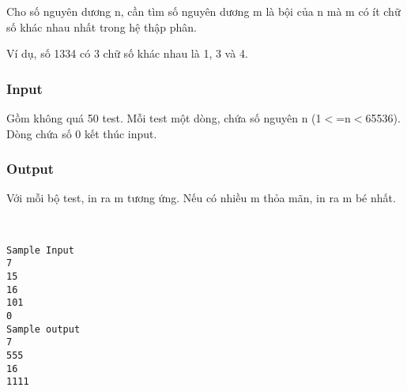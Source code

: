 

Cho số nguyên dương n, cần tìm số nguyên dương m là bội của n mà m có ít chữ số khác nhau nhất trong hệ thập phân.

Ví dụ, số 1334 có 3 chữ số khác nhau là 1, 3 và 4.

\subsubsection{Input}

Gồm không quá 50 test. Mỗi test một dòng, chứa số nguyên n (1$<$=n$<$65536).
\\Dòng chứa số 0 kết thúc input. 

\subsubsection{Output}

Với mỗi bộ test, in ra m tương ứng. Nếu có nhiều m thỏa mãn, in ra m bé nhất. 

 
\begin{verbatim}
Sample Input
7 
15 
16 
101 
0
Sample output
7
555
16
1111
       \end{verbatim}

 